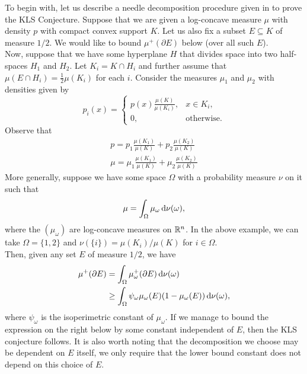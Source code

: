 \documentclass{article}
\begin{document}
To begin with, let us describe a needle decomposition procedure given in \cite{leevempala2018klssurvey} to prove the KLS Conjecture. Suppose that we are given a log-concave measure $\mu$ with density $p$ with compact convex support $K$. Let us also fix a subset $E\subseteq K$ of measure $1/2$. We would like to bound $\mu^+(\partial E)$ below (over all such $E$).\\
Now, suppose that we have some hyperplane $H$ that divides space into two half-spaces $H_1$ and $H_2$. Let $K_i = K \cap H_i$ and further assume that $\mu(E \cap H_i) = \frac{1}{2}\mu(K_i)$ for each $i$. Consider the measures $\mu_1$ and $\mu_2$ with densities given by
\[ p_i(x) =
\begin{cases}
	p(x) \frac{\mu(K)}{\mu(K_i)}, & x \in K_i, \\
	0, & \text{otherwise.}
\end{cases} \]
Observe that
\begin{equation}
	\label{eqn 1}
	\begin{gathered}
		p = p_1 \frac{\mu(K_1)}{\mu(K)} + p_2 \frac{\mu(K_2)}{\mu(K)} \\
		\mu = \mu_1 \frac{\mu(K_1)}{\mu(K)} + \mu_2 \frac{\mu(K_2)}{\mu(K)}
	\end{gathered}
\end{equation}
More generally, suppose we have some space $\Omega$ with a probability measure $\nu$ on it such that
\begin{equation}
	\label{eqn 2: disintegration}
	\mu = \int_\Omega \mu_{\omega} \operatorname{d}\!{\nu}(\omega),
\end{equation}
where the $(\mu_\omega)$ are log-concave measures on $\mathbb{R}^n$. In the above example, we can take $\Omega = \{1,2\}$ and $\nu(\{i\}) = \mu(K_i) / \mu(K)$ for $i\in\Omega$.\\
Then, given any set $E$ of measure $1/2$, we have
\begin{align}
	\mu^+(\partial E) &= \int_{\Omega} \mu_\omega^+(\partial E) \operatorname{d}\!{\nu}(\omega)  \nonumber \\
		&\geq \int_\Omega \psi_\omega \mu_\omega(E) (1-\mu_\omega(E)) \operatorname{d}\!{\nu}(\omega), \label{eqn 4}
\end{align}
where $\psi_\omega$ is the isoperimetric constant of $\mu_\omega$. If we manage to bound the expression on the right below by some constant independent of $E$, then the KLS conjecture follows. It is also worth noting that the decomposition we choose may be dependent on $E$ itself, we only require that the lower bound constant does not depend on this choice of $E$.
\end{document}
